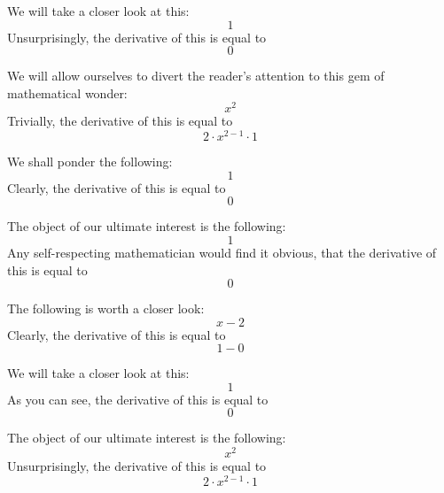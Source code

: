 \documentclass{article}
\begin{document}
We will take a closer look at this:
\begin{equation}
1 
\end{equation}
Unsurprisingly, the derivative of this is equal to
\begin{equation}
0 
\end{equation}

We will allow ourselves to divert the reader's attention to this gem of mathematical wonder:
\begin{equation}
x ^{2 } 
\end{equation}
Trivially, the derivative of this is equal to
\begin{equation}
2 \cdot x ^{2 - 1 } \cdot 1 
\end{equation}

We shall ponder the following:
\begin{equation}
1 
\end{equation}
Clearly, the derivative of this is equal to
\begin{equation}
0 
\end{equation}

The object of our ultimate interest is the following:
\begin{equation}
1 
\end{equation}
Any self-respecting mathematician would find it obvious, that the derivative of this is equal to
\begin{equation}
0 
\end{equation}

The following is worth a closer look:
\begin{equation}
x - 2 
\end{equation}
Clearly, the derivative of this is equal to
\begin{equation}
1 - 0 
\end{equation}

We will take a closer look at this:
\begin{equation}
1 
\end{equation}
As you can see, the derivative of this is equal to
\begin{equation}
0 
\end{equation}

The object of our ultimate interest is the following:
\begin{equation}
x ^{2 } 
\end{equation}
Unsurprisingly, the derivative of this is equal to
\begin{equation}
2 \cdot x ^{2 - 1 } \cdot 1 
\end{equation}
\end{document}
